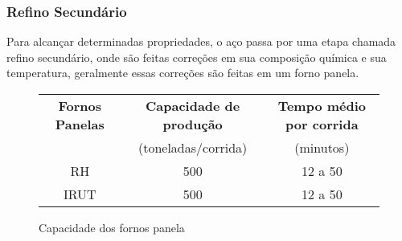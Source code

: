 \subsubsection{Refino Secundário}
Para alcançar determinadas propriedades, o aço passa por uma etapa chamada refino secundário, onde são feitas correções em sua composição química e sua temperatura, geralmente essas correções são feitas em um forno panela.


\begin{figure}[H]
\begin{center}
  \begin{tabular}{|c|c|c|}
    \hline
    {\bf Fornos Panelas} & {\bf Capacidade de produção} & {\bf Tempo médio por corrida} \\
    $\quad$ & (toneladas/corrida)        &    (minutos) \\ \hline
    RH & 500 & 12 a 50 \\ \hline
   IRUT & 500 & 12 a 50 \\ \hline
    
  \end{tabular}
\end{center}
\caption{Capacidade dos fornos panela}
\end{figure}






